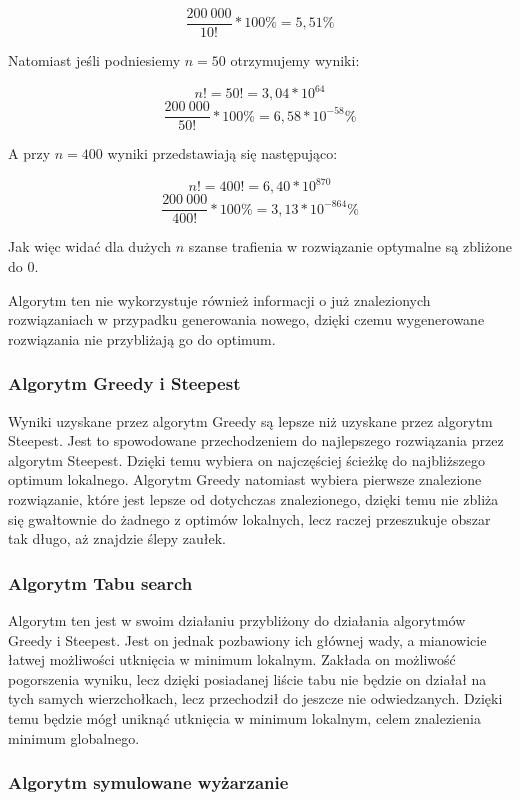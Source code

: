 $$ \frac{200~000}{10!} * 100\% = 5,51\%  $$

Natomiast jeśli podniesiemy $ n = 50 $ otrzymujemy wyniki:

$$ n! = 50! = 3,04 * 10^{64} $$
$$ \frac{200~000}{50!} * 100\% = 6,58 * 10^{-58}\%  $$

A przy $ n = 400 $ wyniki przedstawiają się następująco:

$$ n! = 400! = 6,40 * 10^{870} $$
$$ \frac{200~000}{400!} * 100\% = 3,13 * 10^{-864}\%  $$

Jak więc widać dla dużych $ n $ szanse trafienia w rozwiązanie optymalne są zbliżone do $ 0 $.

Algorytm ten nie wykorzystuje również informacji o już znalezionych rozwiązaniach 
w przypadku generowania nowego, dzięki czemu wygenerowane rozwiązania nie przybliżają
go do optimum.

\subsubsection{Algorytm Greedy i Steepest}

Wyniki uzyskane przez algorytm Greedy są lepsze niż uzyskane przez algorytm Steepest. 
Jest to spowodowane przechodzeniem do najlepszego rozwiązania przez algorytm Steepest. 
Dzięki temu wybiera on najczęściej ścieżkę do najbliższego optimum lokalnego. Algorytm
Greedy natomiast wybiera pierwsze znalezione rozwiązanie, które jest lepsze od dotychczas 
znalezionego, dzięki temu nie zbliża się gwałtownie do żadnego z optimów lokalnych, lecz 
raczej przeszukuje obszar tak długo, aż znajdzie ślepy zaułek.

\subsubsection{Algorytm Tabu search}

Algorytm ten jest w swoim działaniu przybliżony do działania algorytmów Greedy i Steepest.
Jest on jednak pozbawiony ich głównej wady, a mianowicie łatwej możliwości utknięcia w 
minimum lokalnym. Zakłada on możliwość pogorszenia wyniku, lecz dzięki posiadanej liście 
tabu nie będzie on działał na tych samych wierzchołkach, lecz przechodził do jeszcze nie 
odwiedzanych. Dzięki temu będzie mógł uniknąć utknięcia w minimum lokalnym, celem znalezienia
minimum globalnego.

\subsubsection{Algorytm symulowane wyżarzanie}

